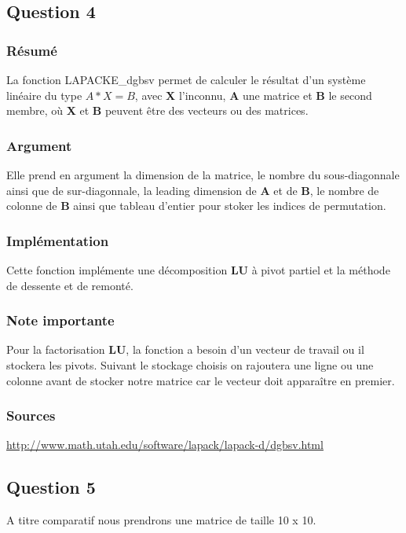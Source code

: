 \documentclass[11pt]{article}
\begin{document}
\subsection{Question 4}
\subsubsection{Résumé}

La fonction LAPACKE\_dgbsv permet de calculer le résultat d'un
système linéaire du type $A * X = B$, avec \textbf{X} l'inconnu, \textbf{A} une
matrice et \textbf{B} le second membre, où \textbf{X} et \textbf{B} peuvent être des
vecteurs ou des matrices.

\subsubsection{Argument}

Elle prend en argument la dimension de la matrice, le nombre du
sous-diagonnale ainsi que de sur-diagonnale, la leading dimension de
\textbf{A} et de \textbf{B}, le nombre de colonne de \textbf{B} ainsi
que tableau d'entier pour stoker les indices de permutation.

\subsubsection{Implémentation}

Cette fonction implémente une décomposition \textbf{LU} à pivot partiel et
la méthode de dessente et de remonté.

\subsubsection{Note importante}

Pour la factorisation \textbf{LU}, la fonction a besoin d'un vecteur de
travail ou il stockera les pivots. Suivant le stockage choisis on
rajoutera une ligne ou une colonne avant de stocker notre matrice
car le vecteur doit apparaître en premier.

\subsubsection{Sources}

\url{http://www.math.utah.edu/software/lapack/lapack-d/dgbsv.html}
   
\subsection{Question 5}
A titre comparatif nous prendrons une matrice de taille 10 x 10.
\end{document}
